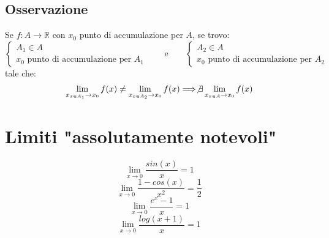 \documentclass{article}
\begin{document}
    \subsection{Osservazione}
    Se $f:A\rightarrow\mathbb{R}$ con $x_0$ punto di accumulazione per $A$, se trovo:
    \begin{equation}
        \begin{cases}
            A_1 \in A\\ 
            \text{$x_0$ punto di accumulazione per $A_1$}
        \end{cases}
        \qquad
        \text{e}
        \qquad
        \begin{cases}
            A_2 \in A\\ 
            \text{$x_0$ punto di accumulazione per $A_2$}
        \end{cases}
    \end{equation}
    tale che:
    \begin{equation}
        \lim_{x_{x\in A_1}\to x_0} f(x) \not = \lim_{x_{x\in A_2}\to x_0} f(x) \Longrightarrow \not\exists \lim_{x_{x\in A}\to x_0} f(x)
    \end{equation}


    \section{Limiti "assolutamente notevoli"}
    \begin{equation}
        \lim_{x\to 0} \frac{sin(x)}{x} = 1
    \end{equation}
    \begin{equation}
        \lim_{x\to 0} \frac{1- cos(x)}{x^2} = \frac{1}{2}
    \end{equation}
    \begin{equation}
        \lim_{x\to 0} \frac{e^x - 1}{x} = 1
    \end{equation}
    \begin{equation}
        \lim_{x\to 0} \frac{log(x+1)}{x} = 1
    \end{equation}
\end{document}
